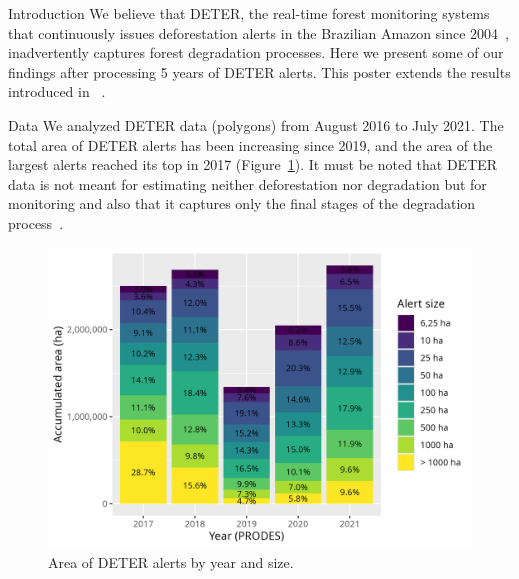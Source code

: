 \documentclass[20pt]{beamer}
\begin{document}
\vspace*{-2cm}
\begin{frame}[fragile,t]
\begin{columns}[t]




\begin{column}{0.33\linewidth}

\vspace{0.5cm}

    \begin{block}{Introduction\vphantom{g}}
        We believe that DETER, the real-time forest monitoring systems that continuously issues deforestation alerts in the Brazilian Amazon since 2004~\cite{shimabukuro2006}, inadvertently captures forest degradation processes.
        Here we present some of our findings after processing 5 years of DETER alerts.
        This poster extends the results introduced in ~\cite{sanchez2023}.
    \end{block}

\vspace{0.5cm}

    \begin{block}{Data}
        We analyzed DETER data (polygons) from August 2016 to July 2021.
        The total area of DETER alerts has been increasing since 2019, and the area of the largest alerts reached its top in 2017 (Figure~\ref{fig:deter_warnings_area_size}).
        It must be noted that DETER data is not meant for estimating neither deforestation nor degradation but for monitoring and also that it captures only the final stages of the degradation process~\cite{dealmeida2022}.

\begin{figure}[h] 
    \begin{center}
    \includegraphics[width=\linewidth]{./figures/deter_warnings_area_size.png}
        \caption{Area of DETER alerts by year and size.}
    \label{fig:deter_warnings_area_size}
    \end{center}
\end{figure}


\end{block}
\end{column}
\end{columns}
\end{frame}
\end{document}
